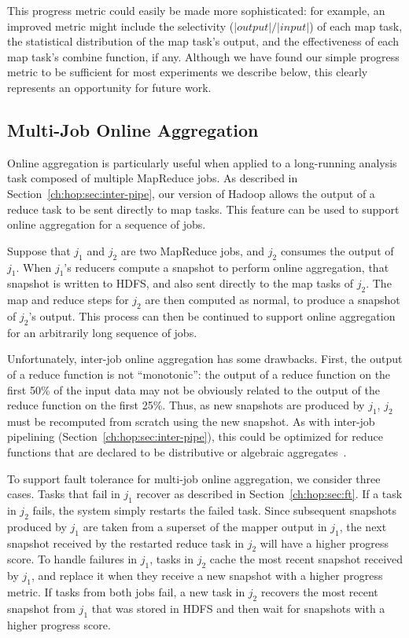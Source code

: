 This progress metric could easily be made more sophisticated: for example, an
improved metric might include the selectivity ($|output|/|input|$) of each map task, the
statistical distribution of the map task's output, and the effectiveness of each
map task's combine function, if any. 
Although we have found our simple progress metric to be
sufficient for most experiments we describe below, this clearly
represents an opportunity for future work.

\subsection{Multi-Job Online Aggregation}
\label{ch:hop:sec:online-multi}

Online aggregation is particularly useful when applied to a long-running
analysis task composed of multiple MapReduce jobs.  As described in
Section~\ref{ch:hop:sec:inter-pipe}, our version of Hadoop allows the output of a
reduce task to be sent directly to map tasks. This feature can be used to
support online aggregation for a sequence of jobs.

Suppose that $j_1$ and $j_2$ are two MapReduce jobs, and $j_2$
consumes the output of $j_1$. When $j_1$'s reducers compute a snapshot
to perform online aggregation, that snapshot is written to HDFS, and
also sent directly to the map tasks of $j_2$. The map and reduce steps
for $j_2$ are then computed as normal, to produce a snapshot of
$j_2$'s output. This process can then be continued to support online
aggregation for an arbitrarily long sequence of jobs.
  
Unfortunately, inter-job online aggregation has some drawbacks. First,
the output of a reduce function is not ``monotonic'': the output of a
reduce function on the first 50\% of the input data may not be
obviously related to the output of the reduce function on the first
25\%. Thus, as new snapshots are produced by $j_1$, $j_2$ must be
recomputed from scratch using the new snapshot. As with inter-job
pipelining (Section~\ref{ch:hop:sec:inter-pipe}), this could be optimized for
reduce functions that are declared to be distributive or algebraic
aggregates~\cite{datacube}.

To support fault tolerance for multi-job online aggregation, we consider three
cases. Tasks that fail in $j_1$ recover as described in Section~\ref{ch:hop:sec:ft}.
If a task in $j_2$ fails, the system simply restarts the failed task. Since
subsequent snapshots produced by $j_1$ are taken from a superset of the mapper
output in $j_1$, the next snapshot received by the restarted reduce task in
$j_2$ will have a higher progress score. To handle failures in $j_1$, tasks in
$j_2$ cache the most recent snapshot received by $j_1$, and replace it when they
receive a new snapshot with a higher progress metric. If tasks from both jobs
fail, a new task in $j_2$ recovers the most recent snapshot from $j_1$ that was
stored in HDFS and then wait for snapshots with a higher progress score.

